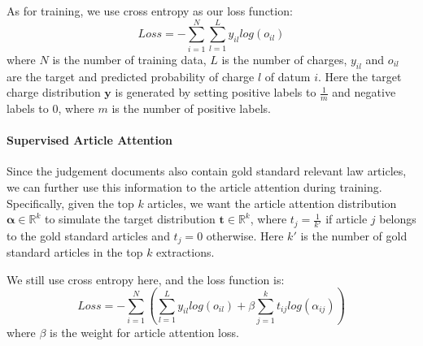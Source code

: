 As for training, we use cross entropy as our loss function:
\begin{equation}
\label{original_loss}
Loss= -\sum_{i=1}^N\sum_{l=1}^L{y_{il} log(o_{il})}
\end{equation} 
where $N$ is the number of training data, $L$ is the number of charges, $y_{il}$ and $o_{il}$ are the target and predicted probability of charge $l$ of datum $i$. Here the target charge distribution $\mathbf{y}$ is generated by setting positive labels to $\frac{1}{m}$ and negative labels to $0$, where $m$ is the number of positive labels.

\paragraph{Supervised Article Attention}
Since the judgement documents also contain gold standard relevant law articles, we can further use this information to  the article attention during training. Specifically, given the top $k$ articles, we want the article attention distribution $\bm{\alpha}\in\mathbb{R}^k$ to simulate the target distribution $\mathbf{t}\in\mathbb{R}^k$, where $t_j=\frac{1}{k'}$ if article $j$ belongs to the gold standard articles and $t_j=0$ otherwise. Here $k'$ is the number of gold standard articles in the top $k$ extractions.


We still use cross entropy here, and the loss function is:
\begin{equation}
\label{final_loss}
Loss = -\sum_{i=1}^N(\sum_{l=1}^L{y_{il} log(o_{il})} + \beta \sum_{j=1}^k{t_{ij} log(\alpha_{ij})})
\end{equation}
where $\beta$ is the weight for article attention loss.



